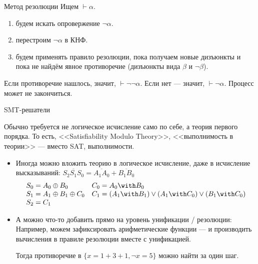 \documentclass[aspectratio=169]{beamer}
\begin{document}
\begin{frame}{Метод резолюции}
Ищем $\vdash\alpha$.

\begin{enumerate}
\item будем искать опровержение $\neg\alpha$.
\item перестроим $\neg\alpha$ в КНФ.
\item будем применять правило резолюции, пока получаем новые дизъюнкты и пока 
не найдём явное противоречие (дизъюнкты вида $\beta$ и $\neg\beta$).
\end{enumerate}

Если противоречие нашлось, значит, $\vdash\neg\neg\alpha$. Если нет --- значит, $\vdash\neg\alpha$.
Процесс может не закончиться.
\end{frame}

\begin{frame}{SMT-решатели}

Обычно требуется не логическое исчисление само по себе, а теория первого порядка.
То есть, <<Satisfiability Modulo Theory>>, <<выполнимость в теории>> --- вместо SAT, выполнимости.
\begin{itemize}
\item Иногда можно вложить теорию в логическое исчисление, 
даже в исчисление высказываний: $\overline{S_2S_1S_0} = \overline{A_1A_0}+\overline{B_1B_0}$
$$\begin{array}{ll}
S_0 = A_0 \oplus B_0 & C_0 = A_0 \with B_0\\
S_1 = A_1 \oplus B_1 \oplus C_0 & C_1 = (A_1 \with B_1) \vee (A_1 \with C_0) \vee (B_1 \with C_0) \\
S_2 = C_1\end{array}$$

\item А можно что-то добавить прямо на уровень унификации / резолюции:
Например, можем зафиксировать арифметические функции --- и производить вычисления
в правиле резолюции вместе с унификацией.

Тогда противоречие в $\{x = 1+3+1,\neg x = 5\}$ можно найти за один шаг.
\end{itemize}
\end{frame}
\end{document}
